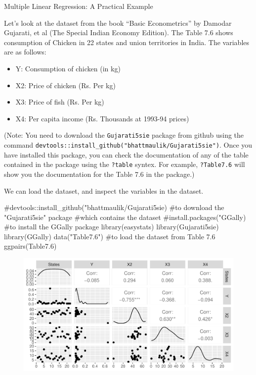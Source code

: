 \documentclass[
  letterpaper,
  paper =a4,
  twoside,
  openright,
  headsepline,
  footsepline,
  listof = totocnumbered,
  chapterprefix = true,
  firstiscover]{scrbook}
\newenvironment{Shaded}{\begin{snugshade}}{\end{snugshade}}
\newcommand{\CommentTok}[1]{\textcolor[rgb]{0.37,0.37,0.37}{#1}}
\newcommand{\FloatTok}[1]{\textcolor[rgb]{0.68,0.00,0.00}{#1}}
\newcommand{\FunctionTok}[1]{\textcolor[rgb]{0.28,0.35,0.67}{#1}}
\newcommand{\NormalTok}[1]{\textcolor[rgb]{0.00,0.23,0.31}{#1}}
\newcommand{\StringTok}[1]{\textcolor[rgb]{0.13,0.47,0.30}{#1}}
\begin{document}
Multiple Linear Regression: A Practical Example

Let's look at the dataset from the book ``Basic Econometrics'' by
Damodar Gujarati, et al (The Special Indian Economy Edition). The Table
7.6 shows consumption of Chicken in 22 states and union territories in
India. The variables are as follows:

\begin{itemize}
\item
  Y: Consumption of chicken (in kg)
\item
  X2: Price of chicken (Rs. Per kg)
\item
  X3: Price of fish (Rs. Per kg)
\item
  X4: Per capita income (Rs. Thousands at 1993-94 prices)
\end{itemize}

(Note: You need to download the \texttt{Gujarati5sie} package from
github using the command
\texttt{devtools::install\_github("bhattmaulik/Gujarati5sie")}. Once you
have installed this package, you can check the documentation of any of
the table contained in the package using the \texttt{?table} syntex. For
example, \texttt{?Table7.6} will show you the documentation for the
Table 7.6 in the package.)

We can load the dataset, and inspect the variables in the dataset.

\begin{Shaded}
\begin{Highlighting}[numbers=left,,]
\CommentTok{\#devtools::install\_github("bhattmaulik/Gujarati5sie) }
\CommentTok{\#to download the "Gujarati5sie" package}
\CommentTok{\#which contains the dataset}
\CommentTok{\#install.packages("GGally)}
\CommentTok{\#to install the GGally package}
\FunctionTok{library}\NormalTok{(easystats)}
\FunctionTok{library}\NormalTok{(Gujarati5sie)}
\FunctionTok{library}\NormalTok{(GGally)}
\FunctionTok{data}\NormalTok{(}\StringTok{"Table7.6"}\NormalTok{)}
\CommentTok{\#to load the dataset from Table 7.6}
\FunctionTok{ggpairs}\NormalTok{(Table7}\FloatTok{.6}\NormalTok{)}
\end{Highlighting}
\end{Shaded}

\begin{figure}[h]

{\centering \includegraphics{Multiple_Regression_files/figure-pdf/unnamed-chunk-1-1.pdf}

}

\end{figure}
\end{document}
